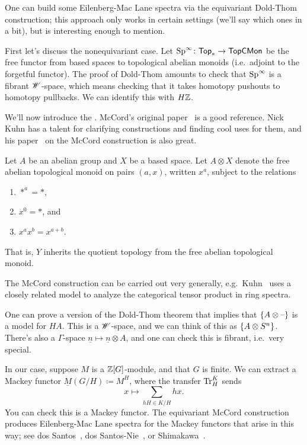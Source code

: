 \begin{cons}
\label{EMcons}
One can build some Eilenberg-Mac Lane spectra via the equivariant Dold-Thom construction; this approach only works
in certain settings (we'll say which ones in a bit), but is interesting enough to mention.

First let's discuss the nonequivariant case. Let $\mathrm{Sp}^\infty\colon\mathsf{Top}_*\to\mathsf{TopCMon}$ be the free functor from
based spaces to topological abelian monoids (i.e.\ adjoint to the forgetful functor). The proof of Dold-Thom
amounts to check that $\mathrm{Sp}^\infty$ is a fibrant $\mathscr W$-space, which means checking that it takes homotopy pushouts
to homotopy pullbacks. We can identify this with $H\mathbb Z$.

We'll now introduce the . McCord's original paper~\cite{McCord} is a good reference. Nick
Kuhn has a talent for clarifying constructions and finding cool uses for them, and his paper~\cite{KuhnMcCord} on
the McCord construction is also great.

Let $A$ be an abelian group and $X$ be a based space. Let $A\otimes X$ denote the free abelian topological monoid
on pairs $(a,x)$, written $x^a$, subject to the relations
\begin{enumerate}
	\item $*^a = *$,
	\item $x^0 = *$, and
	\item $x^ax^b = x^{a+b}$.
\end{enumerate}
That is, $Y$ inherits the quotient topology from the free abelian topological monoid.
\begin{rem}
The McCord construction can be carried out very generally, e.g.\ Kuhn~\cite{KuhnMcCord} uses a closely related
model to analyze the categorical tensor product in ring spectra.
\end{rem}
One can prove a version of the Dold-Thom theorem that implies that $\{A\otimes\text{--}\}$ is a model for $HA$. This is
a $\mathscr W$-space, and we can think of this as $\{A\otimes S^n\}$. There's also a $\Gamma$-space $\underline n\mapsto
\underline n\otimes A$, and one can check this is fibrant, i.e.\ very special.

In our case, suppose $M$ is a $\mathbb Z[G]$-module, and that $G$ is finite. We can extract a Mackey functor $\underline
M(G/H)\coloneqq M^H$, where the transfer $\operatorname{Tr}_H^K$ sends
\[x\mapsto \sum_{hH\in K/H} hx.\]
You can check this is a Mackey functor. The equivariant McCord construction produces Eilenberg-Mac Lane spectra for
the Mackey functors that arise in this way; see dos Santos~\cite{dosSantos}, dos Santos-Nie~\cite{dSN09}, or
Shimakawa~\cite{Shi89}.


\end{cons}
